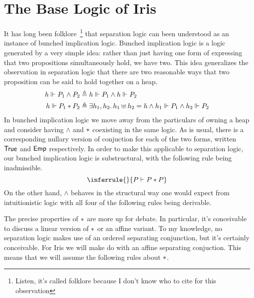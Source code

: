 \documentclass{amsart}
\newcommand{\forces}{\Vdash}
\newcommand{\defs}{\triangleq}
\newcommand{\EMP}{\textlog{Emp}}
\begin{document}
\section{The Base Logic of Iris}

It has long been folklore~\footnote{Listen, it's called folklore
  because I don't know who to cite for this observation} that
separation logic can been understood as an instance of bunched
implication logic. Bunched implication logic is a logic generated by a
very simple idea: rather than just having one form of expressing that
two propositions simultaneously hold, we have two. This idea
generalizes the observation in separation logic that there are two
reasonable ways that two proposition can be said to hold together on a
heap.
\begin{align*}
  h \forces P_1 \land P_2 &\defs h \forces P_1 \land h \forces P_2\\
  h \forces P_1 \sep P_2 &\defs \Exists h_1, h_2. h_1 \uplus h_2 = h
                           \land h_1 \forces P_1
                           \land h_2 \forces P_2
\end{align*}
In bunched implication logic we move away from the particulars of
owning a heap and consider having $\land$ and $\ast$ coexisting in the
same logic. As is usual, there is a corresponding nullary version of
conjuction for each of the two forms, written $\textsf{True}$ and $\EMP$
respectively. In order to make this applicable to separation logic, our
bunched implication logic is substructural, with the following rule
being inadmissible.
\[
  \inferrule{ }{P \vdash P \sep P}
\]
On the other hand, $\land$ behaves in the structural way one would
expect from intuitionistic logic with all four of the following rules
being derivable.
The precise properties of $\ast$ are more up for debate. In
particular, it's conceivable to discuss a linear version of $\ast$
or an affine variant. To my knowledge, no separation logic makes use
of an ordered separating conjunction, but it's certainly
conceivable. For Iris we will make do with an affine separating
conjuction. This means that we will assume the following rules about
$\ast$.
\end{document}

